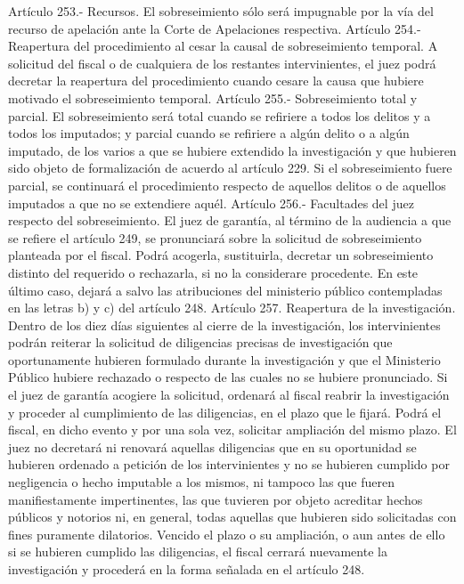     Artículo 253.- Recursos. El sobreseimiento sólo será impugnable por la vía del recurso de apelación ante la Corte de Apelaciones respectiva.
    Artículo 254.- Reapertura del procedimiento al cesar la causal de sobreseimiento temporal. A solicitud del fiscal o de cualquiera de los restantes intervinientes, el juez podrá decretar la reapertura del procedimiento cuando cesare la causa que hubiere motivado el sobreseimiento temporal.
    Artículo 255.- Sobreseimiento total y parcial. El sobreseimiento será total cuando se refiriere a todos los delitos y a todos los imputados; y parcial cuando se refiriere a algún delito o a algún imputado, de los varios a que se hubiere extendido la investigación y que hubieren sido objeto de formalización de acuerdo al artículo 229.
    Si el sobreseimiento fuere parcial, se continuará el procedimiento respecto de aquellos delitos o de aquellos imputados a que no se extendiere aquél.
    Artículo 256.- Facultades del juez respecto del sobreseimiento. El juez de garantía, al término de la audiencia a que se refiere el artículo 249, se pronunciará sobre la solicitud de sobreseimiento planteada por el fiscal. Podrá acogerla, sustituirla, decretar un sobreseimiento distinto del requerido o rechazarla, si no la considerare procedente. En este último caso, dejará a salvo las atribuciones del ministerio público contempladas en las letras b) y c) del artículo 248.
    Artículo 257. Reapertura de la investigación. Dentro de los diez días siguientes al cierre de la investigación, los intervinientes podrán reiterar la solicitud de diligencias precisas de investigación que oportunamente hubieren formulado durante la investigación y que el Ministerio Público hubiere rechazado o respecto de las cuales no se hubiere pronunciado.
    Si el juez de garantía acogiere la solicitud, ordenará al fiscal reabrir la investigación y proceder al cumplimiento de las diligencias, en el plazo que le fijará. Podrá el fiscal, en dicho evento y por una sola vez, solicitar ampliación del mismo plazo.
    El juez no decretará ni renovará aquellas diligencias que en su oportunidad se hubieren ordenado a petición de los intervinientes y no se hubieren cumplido por negligencia o hecho imputable a los mismos, ni tampoco las que fueren manifiestamente impertinentes, las que tuvieren por objeto acreditar hechos públicos y notorios ni, en general, todas aquellas que hubieren sido solicitadas con fines puramente dilatorios.
    Vencido el plazo o su ampliación, o aun antes de ello si se hubieren cumplido las diligencias, el fiscal cerrará nuevamente la investigación y procederá en la forma señalada en el artículo 248.


